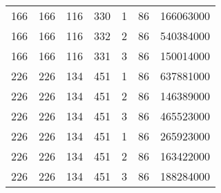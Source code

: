 \documentclass[a4paper,11pt]{article}
\begin{document}
\begin{longtable}{ |c|c|c|c|c|c|c| }
166 & 166 & 116 & 330 & 1 & 86 & 166063000 \\
166 & 166 & 116 & 332 & 2 & 86 & 540384000 \\
166 & 166 & 116 & 331 & 3 & 86 & 150014000 \\
226 & 226 & 134 & 451 & 1 & 86 & 637881000 \\
226 & 226 & 134 & 451 & 2 & 86 & 146389000 \\
226 & 226 & 134 & 451 & 3 & 86 & 465523000 \\
226 & 226 & 134 & 451 & 1 & 86 & 265923000 \\
226 & 226 & 134 & 451 & 2 & 86 & 163422000 \\
226 & 226 & 134 & 451 & 3 & 86 & 188284000 \\
 
 

      \hline
    \end{longtable}
    
\end{document}
